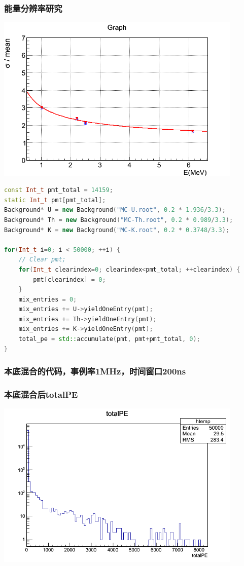 \begin{frame}
    \frametitle{能量分辨率研究}
    \includegraphics[height=8cm,keepaspectratio]{data/sigma.png}
\end{frame}

\newsavebox{\BackgroundTest}
\begin{lrbox}{\BackgroundTest}
\begin{lstlisting}[language=C++]
const Int_t pmt_total = 14159;
static Int_t pmt[pmt_total];
Background* U = new Background("MC-U.root", 0.2 * 1.936/3.3);
Background* Th = new Background("MC-Th.root", 0.2 * 0.989/3.3);
Background* K = new Background("MC-K.root", 0.2 * 0.3748/3.3);     

for(Int_t i=0; i < 50000; ++i) {
    // Clear pmt;
    for(Int_t clearindex=0; clearindex<pmt_total; ++clearindex) {
        pmt[clearindex] = 0;
    }
    mix_entries = 0;
    mix_entries += U->yieldOneEntry(pmt);
    mix_entries += Th->yieldOneEntry(pmt);
    mix_entries += K->yieldOneEntry(pmt);
    total_pe = std::accumulate(pmt, pmt+pmt_total, 0);
}

\end{lstlisting}
\end{lrbox}

\begin{frame}
    \frametitle{本底混合的代码，事例率1MHz，时间窗口200ns}
    \par\usebox{\BackgroundTest}
\end{frame}

\begin{frame}
    \frametitle{本底混合后totalPE}
    \includegraphics[height=8cm,keepaspectratio]{data/mixed_background_totalpe_1MHz_200ns.png}
\end{frame}

